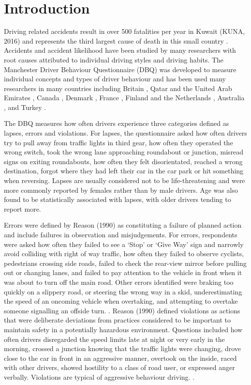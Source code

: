 \documentclass[preprint,12pt,a4paper,authoryear]{elsarticle}
\begin{document}
\section{Introduction}
Driving related accidents result in over 500 fatalities per year in Kuwait (KUNA, 2016) and represents the third largest cause of death in this small country \citep{Wang2016}. Accidents and accident likelihood have been studied by many researchers with root causes attributed to individual driving styles and driving habits.  The Manchester Driver Behaviour Questionnaire (DBQ) was developed to measure individual concepts and types of driver behaviour and has been used many researchers in many countries including Britain \citep{Reason1990}, Qatar and the United Arab Emirates \citep{Bener2008}, Canada \citep{Cordazzo2014}, Denmark \citep{Martinussen2013}, France \citep{Gu2014}, Finland and the Netherlands \citep{Lajunen2004}, Australia \citep{Stephens2016}, and Turkey \citep{Sumer2003}. 

The DBQ measures how often drivers experience three categories defined as lapses, errors and violations. For lapses, the questionnaire asked how often drivers try to pull away from traffic lights in third gear, how often they operated the wrong switch, took the wrong lane approaching roundabout or junction, misread signs on exiting roundabouts, how often they felt disorientated, reached a wrong destination, forgot where they had left their car in the car park or hit something when reversing. Lapses are usually considered not to be life-threatening and were more commonly reported by females rather than by male drivers. Age was also found to be statistically associated with lapses, with older drivers tending to report more. 

Errors were defined by Reason (1990) as constituting a failure of planned action and include failures in observation and misjudgements. For errors, respondents were asked how often they failed to see a `Stop' or `Give Way' sign and narrowly avoid colliding with right of way traffic, how often they failed to observe cyclists, pedestrians crossing side roads, failed to check the rear-view mirror before pulling out or changing lanes, and failed to pay attention to the vehicle in front when it was about to turn off the main road. Other errors identified were braking too quickly on a slippery road, or steering the wrong way in a skid, underestimating the speed of an oncoming vehicle when overtaking, and attempting to overtake someone signalling an offside turn. \citep{Reason1990}. Reason (1990) defined violations as  actions that were deliberate deviations from practices considered to be important to maintain safety in a potentially hazardous environment. Questions included how often drivers disregarded the speed limits late at night or very early in the morning, crossed a junction knowing that the traffic lights were changing, drove close to the car in front in an aggressive manner, overtook on the inside, raced with other drivers, showed hostility to a class of road user, or expressed anger verbally. Violations are typical of aggressive behaviour driving. \citep{Reason1990}. 
\end{document}
